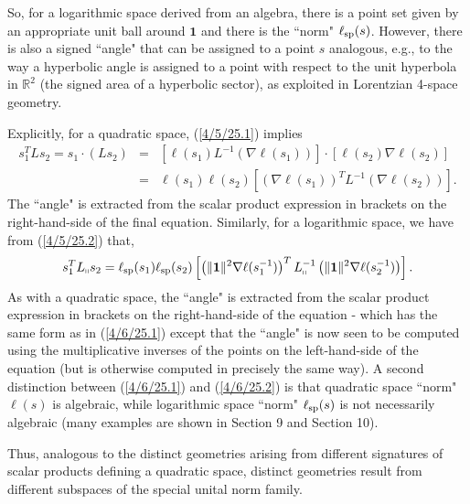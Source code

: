 \documentclass{amsart}
\numberwithin{equation}{section}
\theoremstyle{definition}
\numberwithin{theorem}{section}
\begin{document}
So, for a logarithmic space derived from an algebra, there is a point set given by an appropriate unit ball around $\mathbf{1}$  and there is the ``norm" $\ell_{\rm sp}(s)$.  However, there is also a signed ``angle" that can be assigned to a point $s$ analogous, e.g., to the way a hyperbolic angle is assigned to a point with respect to the unit hyperbola in $\mathbb{R}^2$ (the signed area of a hyperbolic sector), as exploited in Lorentzian 4-space geometry.  

Explicitly, for a quadratic space, (\ref{4/5/25.1}) implies
\begin{eqnarray} \nonumber s_1^TLs_2 = s_1\cdot (Ls_2)  
&=& \left[\ell(s_1) L^{-1} \left(\nabla\ell(s_1)\right)\right] \cdot \left[\ell(s_2)\nabla\ell(s_2)\right] \\  &=& \ell(s_1) \ell(s_2) \left[ \left(\nabla\ell(s_1)\right)^T L^{-1} \left(\nabla\ell(s_2)\right)\right].\label{4/6/25.1}\end{eqnarray}  The ``angle" is extracted from the scalar product expression in brackets on the right-hand-side of the final equation.   Similarly, for a logarithmic space, we have from (\ref{4/5/25.2}) that, 
\begin{equation}\label{4/6/25.2} s_1^T L_{\shortparallel} s_2 = \ell_{\rm sp} (s_1)\ell_{\rm sp}(s_2) \left[ \left(\|\mathbf{1}\|^2 \nabla\ell(s_1^{-1})\right)^T L_{\shortparallel}^{-1} \left(\|\mathbf{1}\|^2\nabla\ell(s_2^{-1})\right)\right].\end{equation} As with a quadratic space, the ``angle" is extracted from the scalar product expression in brackets on the right-hand-side of the equation - which has the same form as in (\ref{4/6/25.1}) except that the ``angle" is now seen to be computed using the multiplicative inverses of the points on the left-hand-side of the equation (but is otherwise computed in precisely the same way).  A second distinction between (\ref{4/6/25.1}) and (\ref{4/6/25.2}) is that quadratic space ``norm" $\ell(s)$ is algebraic, while logarithmic space ``norm" $\ell_{\rm sp}(s)$ is not necessarily algebraic (many examples are shown in Section 9 and Section 10).

Thus, analogous to the distinct geometries arising from different signatures of scalar products defining a quadratic space, distinct geometries result from different subspaces of the special unital norm family.
\end{document}
